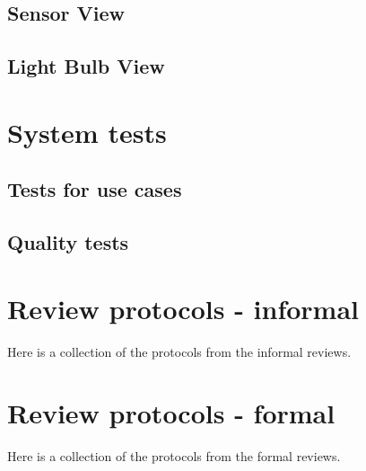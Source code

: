 \documentclass[a4paper]{article}
\begin{document}
\subsection{Sensor View}




\subsection{Light Bulb View}



\newpage
\section{System tests}

\subsection{Tests for use cases}



\subsection{Quality tests}



\newpage
\section{Review protocols - informal}
Here is a collection of the protocols from the informal reviews.

\newpage
\section{Review protocols - formal}
Here is a collection of the protocols from the formal reviews.
\end{document}
